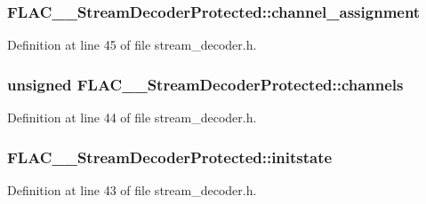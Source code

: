 \subsubsection[{\texorpdfstring{channel\+\_\+assignment}{channel_assignment}}]{ F\+L\+A\+C\+\_\+\+\_\+\+Stream\+Decoder\+Protected\+::channel\+\_\+assignment}\hypertarget{struct_f_l_a_c_____stream_decoder_protected_a91711a38e514c69336a8880abd172574}{}\label{struct_f_l_a_c_____stream_decoder_protected_a91711a38e514c69336a8880abd172574}


Definition at line 45 of file stream\+\_\+decoder.\+h.

\subsubsection[{\texorpdfstring{channels}{channels}}]{\setlength{\rightskip}{0pt plus 5cm}unsigned F\+L\+A\+C\+\_\+\+\_\+\+Stream\+Decoder\+Protected\+::channels}\hypertarget{struct_f_l_a_c_____stream_decoder_protected_af7f63ea3b944faea8bff36b9f1446947}{}\label{struct_f_l_a_c_____stream_decoder_protected_af7f63ea3b944faea8bff36b9f1446947}


Definition at line 44 of file stream\+\_\+decoder.\+h.

\subsubsection[{\texorpdfstring{initstate}{initstate}}]{ F\+L\+A\+C\+\_\+\+\_\+\+Stream\+Decoder\+Protected\+::initstate}\hypertarget{struct_f_l_a_c_____stream_decoder_protected_a20152b0ff6c0e1de935c6cba0a06c4ed}{}\label{struct_f_l_a_c_____stream_decoder_protected_a20152b0ff6c0e1de935c6cba0a06c4ed}


Definition at line 43 of file stream\+\_\+decoder.\+h.

